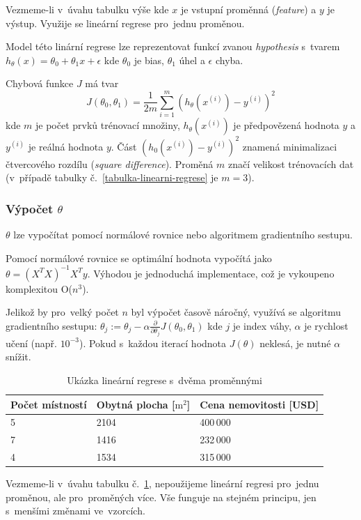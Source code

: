 Vezmeme-li v~úvahu tabulku výše kde $x$ je vstupní proměnná (\emph{feature}) a $y$ je výstup.
Využije se lineární regrese pro~jednu proměnou.

Model této linární regrese lze reprezentovat funkcí zvanou \emph{hypothesis} s~tvarem $h_\theta(x) = \theta_0 + \theta_1 x + \epsilon$
kde $\theta_0$ je bias, $\theta_1$ úhel a $\epsilon$ chyba.

Chybová funkce $J$ má tvar
$$J(\theta_0, \theta_1) = \frac{1}{2m} \sum_{i=1}^{m} (h_\theta (x^{(i)}) - y^{(i)})^2$$
kde $m$ je počet prvků trénovací množiny, $h_\theta(x^{(i)})$ je předpovězená hodnota $y$ a $y^{(i)}$ je reálná hodnota $y$.
Část $(h_0(x^{(i)})-y^{(i)})^2$ znamená minimalizaci čtvercového rozdílu (\emph{square difference}).
Proměná $m$ značí velikost trénovacích dat (v~případě tabulky č.~\ref{tabulka-linearni-regrese} je $m= 3$).

\subsubsection{Výpočet $\theta$}

$\theta$ lze vypočítat pomocí normálové rovnice nebo algoritmem gradientního sestupu.

Pomocí normálové rovnice se optimální hodnota vypočítá jako $\theta = (X^T X)^{-1} X^T y$.
Výhodou je jednoduchá implementace, což je vykoupeno komplexitou O($n^3$).

Jelikož by pro~velký počet $n$ byl výpočet časově náročný, využívá se algoritmu gradientního sestupu:
$\theta_j := \theta_j - \alpha \frac{\partial}{\partial \theta_j} J(\theta_0, \theta_1)$
kde $j$ je index váhy, $\alpha$ je rychlost učení (např. $10^{-3}$).
Pokud s~každou iterací hodnota $J(\theta)$ neklesá, je nutné $\alpha$ snížit.

\begin{table}[ht]
	\centering
	\begin{tabular}{ |l|l|l|}
    Počet místností & Obytná plocha [$\text{m}^2$] & Cena nemovitosti [USD] \\ \hline \hline
    5 & 2104 & 400\,000 \\ \hline
    7 & 1416 & 232\,000 \\ \hline
    4 & 1534 & 315\,000 \\ \hline
	\end{tabular}
	\caption{Ukázka lineární regrese s~dvěma proměnnými}
    \label{upravena-tabulka-linearni-regrese}
\end{table}

Vezmeme-li v~úvahu tabulku č.~\ref{upravena-tabulka-linearni-regrese}, nepoužijeme lineární regresi pro~jednu proměnou, ale pro~proměných více.
Vše funguje na stejném principu, jen s~menšími změnami ve~vzorcích.

